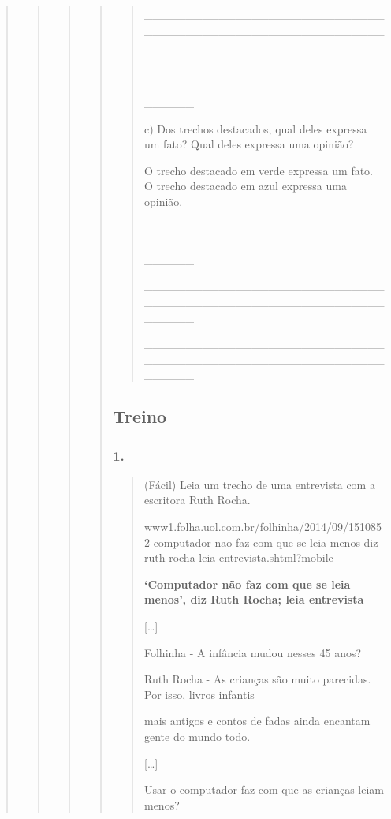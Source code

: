 \begin{quote}
\begin{quote}
\begin{quote}
\begin{quote}
\begin{quote}
\_\_\_\_\_\_\_\_\_\_\_\_\_\_\_\_\_\_\_\_\_\_\_\_\_\_\_\_\_\_\_\_\_\_\_\_\_\_\_\_\_\_\_\_\_\_\_\_\_\_\_\_\_\_\_\_\_\_\_\_\_\_\_\_

\_\_\_\_\_\_\_\_\_\_\_\_\_\_\_\_\_\_\_\_\_\_\_\_\_\_\_\_\_\_\_\_\_\_\_\_\_\_\_\_\_\_\_\_\_\_\_\_\_\_\_\_\_\_\_\_\_\_\_\_\_\_\_\_

c) Dos trechos destacados, qual deles expressa um fato? Qual deles
expressa uma opinião?

O trecho destacado em verde expressa um fato. O trecho destacado em azul
expressa uma opinião.

\_\_\_\_\_\_\_\_\_\_\_\_\_\_\_\_\_\_\_\_\_\_\_\_\_\_\_\_\_\_\_\_\_\_\_\_\_\_\_\_\_\_\_\_\_\_\_\_\_\_\_\_\_\_\_\_\_\_\_\_\_\_\_\_

\_\_\_\_\_\_\_\_\_\_\_\_\_\_\_\_\_\_\_\_\_\_\_\_\_\_\_\_\_\_\_\_\_\_\_\_\_\_\_\_\_\_\_\_\_\_\_\_\_\_\_\_\_\_\_\_\_\_\_\_\_\_\_\_

\_\_\_\_\_\_\_\_\_\_\_\_\_\_\_\_\_\_\_\_\_\_\_\_\_\_\_\_\_\_\_\_\_\_\_\_\_\_\_\_\_\_\_\_\_\_\_\_\_\_\_\_\_\_\_\_\_\_\_\_\_\_\_\_
\end{quote}

\subsection{Treino}\label{treino-7}

\subsubsection{1. }\label{section-63}

\begin{quote}
(Fácil) Leia um trecho de uma entrevista com a escritora Ruth Rocha.

www1.folha.uol.com.br/folhinha/2014/09/1510852-computador-nao-faz-com-que-se-leia-menos-diz-ruth-rocha-leia-entrevista.shtml?mobile

\textbf{`Computador não faz com que se leia menos', diz Ruth Rocha; leia
entrevista}

{[}\ldots{}{]}

Folhinha - A infância mudou nesses 45 anos?

Ruth Rocha - As crianças são muito parecidas. Por isso, livros infantis

mais antigos e contos de fadas ainda encantam gente do mundo todo.

{[}\ldots{}{]}

Usar o computador faz com que as crianças leiam menos?


\end{quote}
\end{quote}
\end{quote}
\end{quote}
\end{quote}
